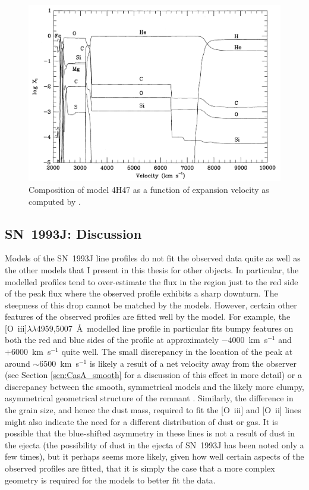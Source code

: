 \begin{figure}
\centering
\includegraphics[scale=0.4,clip=true, trim=30 0 0 0]{chapters/chapter6/figs/93J/explosion_model.png}
\caption{Composition of model 4H47 as a function of expansion velocity as computed by \citet{Nomoto1993}.}
\label{4h47}
\end{figure}

\subsection{SN~1993J:  Discussion}
\label{scn:discuss93j}
Models of the SN~1993J line profiles do not fit the observed data quite as well as the other models that I present in this thesis for other objects.  In particular, the modelled profiles tend to over-estimate the flux in the region just to the red side of the peak flux where the observed profile exhibits a sharp downturn.  The steepness of this drop cannot be matched by the models.  However, certain other features of the observed profiles are fitted well by the model.  For example, the [O~{\sc iii}]$\lambda\lambda$4959,5007~\AA\  modelled line profile in particular fits bumpy features on both the red and blue sides of the profile at approximately $-4000$~km~s$^{-1}$ and $+6000$~km~s$^{-1}$ quite well.  The small discrepancy in the location of the peak at around $\sim6500$~km~s$^{-1}$ is likely a result of a net velocity away from the observer (see Section \ref{scn:CasA_smooth} for a discussion of this effect in more detail) or a discrepancy between the smooth, symmetrical models and the likely more clumpy, asymmetrical geometrical structure of the remnant \citep{Tran1997}.  Similarly, the difference in the grain size, and hence the dust mass, required to fit the [O~{\sc iii}] and [O~{\sc ii}] lines might also indicate the need for a different distribution of dust or gas.  It is possible that the blue-shifted asymmetry in these lines is not a result of dust in the ejecta (the possibility of dust in the ejecta of SN~1993J has been noted only a few times), but it perhaps seems more likely, given how well certain aspects of the observed profiles are fitted, that it is simply the case that a more complex geometry is required for the models to better fit the data.


